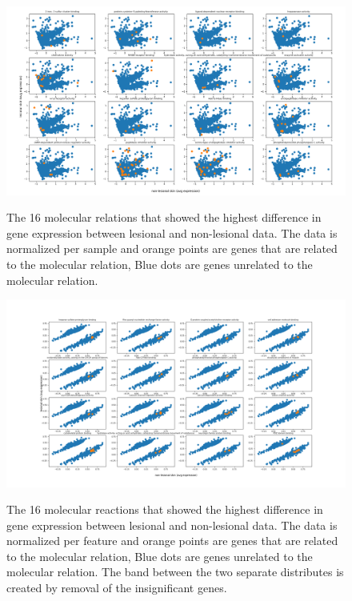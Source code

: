 \documentclass[10pt,a4paper]{report}
\begin{document}
	\begin{figure}[H]
		\includegraphics[width=1\textwidth]{Sign_Molecular_Psoriasis.png}
		\label{fig:MolecularScaledBySample}
		\caption{The 16 molecular relations that showed the highest difference in gene expression between lesional and non-lesional data. The data is normalized per sample and orange points are genes that are related to the molecular relation, Blue dots are genes unrelated to the molecular relation.}
	\end{figure}
	
	\begin{figure}[H]
		\includegraphics[width=1\textwidth]{Sign_Molecular_Psoriasis_Scaled.png}
		\label{fig:MolecularScaledByFeature1}
		\caption{The 16 molecular reactions that showed the highest difference in gene expression between lesional and non-lesional data. The data is normalized per feature and orange points are genes that are related to the molecular relation, Blue dots are genes unrelated to the molecular relation. The band between the two separate distributes is created by removal of the insignificant genes.}
	\end{figure}
	
\end{document}

